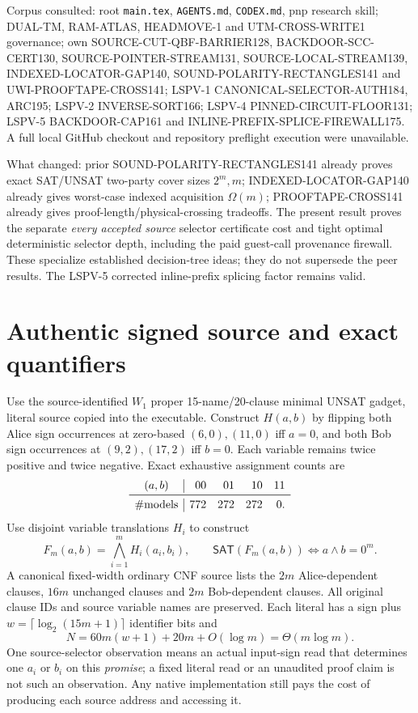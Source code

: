\documentclass[11pt]{article}
\newcommand{\SAT}{\mathsf{SAT}}
\begin{document}
Corpus consulted: root \texttt{main.tex}, \texttt{AGENTS.md},
\texttt{CODEX.md}, pnp research skill; DUAL-TM, RAM-ATLAS,
HEADMOVE-1 and UTM-CROSS-WRITE1 governance; own
SOURCE-CUT-QBF-BARRIER128, BACKDOOR-SCC-CERT130,
SOURCE-POINTER-STREAM131, SOURCE-LOCAL-STREAM139,
INDEXED-LOCATOR-GAP140, SOUND-POLARITY-RECTANGLES141
and UWI-PROOFTAPE-CROSS141; LSPV-1 CANONICAL-SELECTOR-AUTH184,
ARC195; LSPV-2 INVERSE-SORT166; LSPV-4
PINNED-CIRCUIT-FLOOR131; LSPV-5 BACKDOOR-CAP161 and
INLINE-PREFIX-SPLICE-FIREWALL175. A full local GitHub
checkout and repository preflight execution were unavailable.

What changed: prior SOUND-POLARITY-RECTANGLES141 already proves
exact SAT/UNSAT two-party cover sizes $2^m,m$;
INDEXED-LOCATOR-GAP140 already gives worst-case indexed
acquisition $\Omega(m)$; PROOFTAPE-CROSS141 already gives
proof-length/physical-crossing tradeoffs. The present result
proves the separate \emph{every accepted source} selector
certificate cost and tight optimal deterministic selector
depth, including the paid guest-call provenance firewall.
These specialize established decision-tree ideas; they do not
supersede the peer results. The LSPV-5 corrected inline-prefix
splicing factor remains valid.

\section{Authentic signed source and exact quantifiers}
Use the source-identified $W_1$ proper 15-name/20-clause
minimal UNSAT gadget, literal source copied into the executable.
Construct $H(a,b)$ by flipping both Alice sign occurrences at
zero-based $(6,0),(11,0)$ iff $a=0$, and both Bob sign
occurrences at $(9,2),(17,2)$ iff $b=0$. Each variable
remains twice positive and twice negative. Exact exhaustive
assignment counts are
\[
\begin{array}{c|rrrr}
(a,b)&00&01&10&11\\\midrule
\#\mathrm{models}&772&272&272&0 .
\end{array}
\]
Use disjoint variable translations $H_i$ to construct
\[
F_m(a,b)=\bigwedge_{i=1}^m H_i(a_i,b_i),\qquad
\SAT(F_m(a,b))\iff a\wedge b=0^m. \tag{1}
\]
A canonical fixed-width ordinary CNF source lists the $2m$
Alice-dependent clauses, $16m$ unchanged clauses and $2m$
Bob-dependent clauses. All original clause IDs and source
variable names are preserved. Each literal has a sign plus
$w=\lceil\log_2(15m+1)\rceil$ identifier bits and
\[
N=60m(w+1)+20m+O(\log m)=\Theta(m\log m).
\]
One source-selector observation means an actual input-sign
read that determines one $a_i$ or $b_i$ on this \emph{promise};
a fixed literal read or an unaudited proof claim is not
such an observation. Any native implementation still pays
the cost of producing each source address and accessing it.
\end{document}
